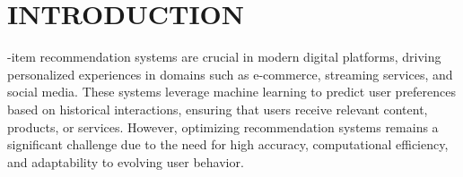 \documentclass{ieeetj}
\begin{document}


\maketitle

\section{INTRODUCTION}



-item recommendation systems are crucial in modern digital platforms, driving personalized experiences in domains such as e-commerce, streaming services, and social media. These systems leverage machine learning to predict user preferences based on historical interactions, ensuring that users receive relevant content, products, or services. However, optimizing recommendation systems remains a significant challenge due to the need for high accuracy, computational efficiency, and adaptability to evolving user behavior.
\end{document}

